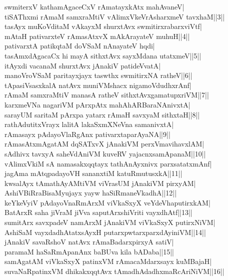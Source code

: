 \documentclass{article}
\begin{document}
swmiterxV kathamAgaceCxV rAmatayxkAtx mahAvaneV|\\
tiSAThxmi rAmaM samxraMtiV vAlimxVkeVrAsharxmeV tavxhaM||3||\\
tasAyx muKoVditaM vAkayxM shurxtAvx swmitirxrabarxviVtf|\\
mAtaH pativarxteV rAmasAtxvX mAkArayateV muhuH||4||\\
pativarxtA patikqtaM doVSaM nAnayateV hqdi|\\
tasAmxdAgacaCx hi mayA sithxtAvx sayxMdana utatxmeV||5||\\
itAyxdi vacanaM shurxtAvx jAnakiV patideVvatA|\\
manoVroVSaM paritayxjayx taswthx swmitirxNA ratheV||6||\\
tApasiVsasxkalA natAvx muniVMshacx nigamoVdudhxrAnf|\\
rAmaM samxraMtiV manasA ratheV sithxtAvxgamatupxriVM||7||\\
karxmeVNa nagariVM pArxpAtx mahAhARBaraNAnivxtA|\\
sarayUM saritaM pArxpa yatarx rAmaH savxyaM sithxtaH||8||\\
rathAdutitxVrayx lalitA lakaSxmXNeVna samanivxtA|\\
rAmasayx pAdayoVlaRgAnx pativarxtaparAyaNA||9||\\
rAmasAtxmAgatAM dqSATxvX jAnakiVM perxVmavihavxlAM|\\
sAdhivx tavxyA saheVdAniVM kuveRV yajacnxsamApanaM||10||\\
vAlimxVkiM sA namasakxqqtayx tathAnAyxnivx parxsatatxmAnf|\\
jagAma mAtqpadayoVH sananxtiM katuRmutusxkA||11||\\
kwsalAyx tAmathAyAMtiVM viVrasUM jAnakiVM pirxyAM|\\
AshiVBiRraBisaMyujayx yayw haSiRmaneVkadhA||12||\\
keYkeVyiV pAdayoVnaRmArxM viVkaSxyX veYdeVhaputirxkAM|\\
BatArxR saha jiVraM jiVva saputArxshiVriti vayxdhAtf||13||\\
sumitArx savxpadeV namArxM jAnakiVM viVkaSxyX putirxNiVM|\\
AshiSaM vayxdadhAtatxsAyxH putarxpwtarxparxdAyiniVM||14||\\
jAnakiV savaRshoV natAvx rAmaBadarxpirxyA satiV|\\
paramaM haSaRmApanAnx baBUva kila bADaba||15||\\
samAgatAM viVkaSxyX patinxVM rAmacaMdarxsayx kuMBajaH|\\
suvaNaRpatinxVM dhikakxqqtAvx tAmadhAdadhxmaRcAriNiVM||16||\\
\end{document}
